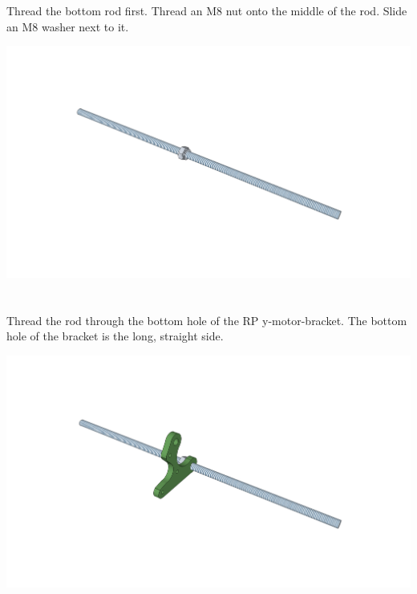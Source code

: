 \documentclass[twoside,a4paper,titlepage]{memoir}
\begin{document}
	\section{}
	Thread the bottom rod first. Thread an M8 nut onto the middle of the rod. Slide an M8 washer next to it.\\
	\begin{center}
		\includegraphics[width=1\linewidth]{graphics/ch2_1.png}
	\end{center}
	
	\section{}
	Thread the rod through the bottom hole of the RP y-motor-bracket. The bottom hole of the bracket is the
	long, straight side.\\
	\begin{center}
		\includegraphics[width=1\linewidth]{graphics/ch2_2.png}
	\end{center}
	
\end{document}
